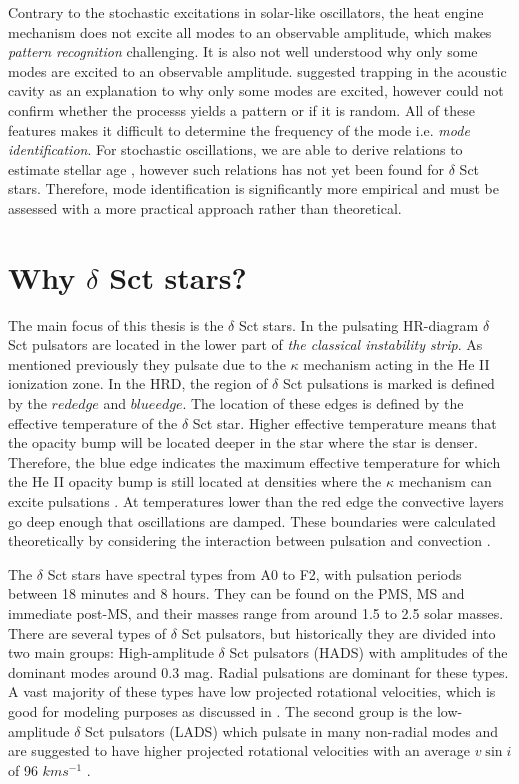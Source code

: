 Contrary to the stochastic excitations in solar-like oscillators, the heat engine mechanism does not excite all modes to an observable amplitude, which makes \textit{pattern recognition} challenging.  It is also not well understood why only some modes are excited to an observable amplitude. \citet{dziembowski1990} suggested trapping in the acoustic cavity as an explanation to why only some modes are excited, however could not confirm whether the processs yields a pattern or if it is random. All of these features makes it difficult to determine the frequency of the mode i.e. \textit{mode identification}. For stochastic oscillations, we are able to derive relations to estimate stellar age \citep{kjeldsen2011amplitudes}, however such relations has not yet been found for $\delta $ Sct stars. Therefore, mode identification is significantly more empirical and must be assessed with a  more practical approach rather than theoretical.  


\section{Why $\delta$ Sct stars?}
\label{sec:why}

The main focus of this thesis is the $\delta$ Sct stars. In the pulsating HR-diagram $\delta$ Sct pulsators are located in the lower part of \textit{the classical instability strip}. As mentioned previously they pulsate due to the $\kappa$ mechanism acting in the He II ionization zone. In the HRD, the region of $\delta$  Sct  pulsations is marked is defined by the $red edge$ and $blue edge$. The location of these edges is defined by the effective temperature of the $\delta$ Sct star. Higher effective temperature means that the opacity bump will be located deeper in the star where the star is denser. Therefore, the blue edge indicates the maximum effective temperature for which the He II opacity bump is still located at densities where the $\kappa$ mechanism can excite pulsations \citep{pamyatnykh2000}. At temperatures lower than the red edge the convective layers go deep enough that oscillations are damped. These boundaries were calculated theoretically by considering the interaction between pulsation and convection \citep{grigahcene2005convection, dupret2004theoretical}.  

The $\delta$ Sct stars have spectral types from A0 to F2, with pulsation periods between 18 minutes and 8 hours. They can be found on the PMS, MS and immediate post-MS, and their masses range from around 1.5 to 2.5 solar masses. There are several types of $\delta$ Sct pulsators, but historically they are divided into two main groups: High-amplitude $\delta$ Sct pulsators (HADS) with amplitudes of the dominant modes around 0.3 mag. Radial pulsations are dominant for these types. A vast majority of these types have low projected rotational velocities, which is good for modeling purposes as discussed in . The second group is the low-amplitude $\delta$ Sct pulsators (LADS) which pulsate in many non-radial modes and are suggested to have higher projected rotational velocities with an average $v\sin i$ of 96 $km s^{-1}$ \citep{solano1997spectroscopic}.

